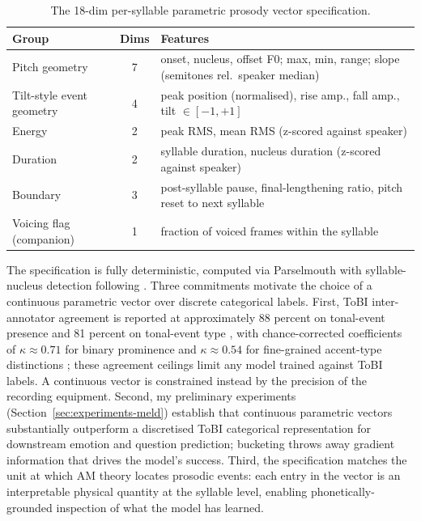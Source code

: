 \documentclass[11pt,letterpaper]{article}
\begin{document}
\begin{table}[h]
    \centering
    \small
    \begin{tabular}{@{}l c p{}@{}}
    \toprule
    \textbf{Group} & \textbf{Dims} & \textbf{Features} \\
    \midrule
    Pitch geometry & 7 & onset, nucleus, offset F0; max, min, range; slope (semitones rel.\ speaker median) \\
    Tilt-style event geometry & 4 & peak position (normalised), rise amp., fall amp., tilt $\in [-1, +1]$ \\
    Energy & 2 & peak RMS, mean RMS (z-scored against speaker) \\
    Duration & 2 & syllable duration, nucleus duration (z-scored against speaker) \\
    Boundary & 3 & post-syllable pause, final-lengthening ratio, pitch reset to next syllable \\
    \midrule
    Voicing flag (companion) & 1 & fraction of voiced frames within the syllable \\
    \bottomrule
    \end{tabular}
    \caption{The 18-dim per-syllable parametric prosody vector specification.}
    \label{tab:dims}
\end{table}

The specification is fully deterministic, computed via Parselmouth \citep{jadoul2018parselmouth, boersma2001praat} with syllable-nucleus detection following \citet{dejong2009syllables}. Three commitments motivate the choice of a continuous parametric vector over discrete categorical labels. First, ToBI inter-annotator agreement is reported at approximately 88 percent on tonal-event presence and 81 percent on tonal-event type \citep{pitrelli1994, syrdal2000, yoon2004}, with chance-corrected coefficients of $\kappa \approx 0.71$ for binary prominence and $\kappa \approx 0.54$ for fine-grained accent-type distinctions \citep{breen2012reliability}; these agreement ceilings limit any model trained against ToBI labels. A continuous vector is constrained instead by the precision of the recording equipment. Second, my preliminary experiments (Section~\ref{sec:experiments-meld}) establish that continuous parametric vectors substantially outperform a discretised ToBI categorical representation for downstream emotion and question prediction; bucketing throws away gradient information that drives the model's success. Third, the specification matches the unit at which AM theory locates prosodic events: each entry in the vector is an interpretable physical quantity at the syllable level, enabling phonetically-grounded inspection of what the model has learned.
\end{document}
